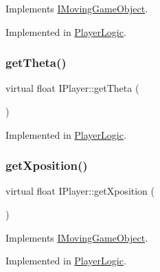 Implements \hyperlink{class_i_moving_game_object_ab2120f126d088beda46654aa3ccfd705}{I\+Moving\+Game\+Object}.



Implemented in \hyperlink{class_player_logic_a2ca2c54d1e07bfc40a08b5c55403af3a}{Player\+Logic}.

\mbox{\label{class_i_player_a05103e6bebfd4230bab62d112c7e4eec}} 
\subsubsection{\texorpdfstring{get\+Theta()}{getTheta()}}
{\footnotesize\ttfamily virtual float I\+Player\+::get\+Theta (\begin{DoxyParamCaption}{ }\end{DoxyParamCaption})\hspace{0.3cm}{\ttfamily [pure virtual]}}



Implemented in \hyperlink{class_player_logic_a7ea2f59ddde028b5451ddbe60453de1c}{Player\+Logic}.

\mbox{\label{class_i_player_a9df96a1fd43f35f2579e2ec4a167acfe}} 
\subsubsection{\texorpdfstring{get\+Xposition()}{getXposition()}}
{\footnotesize\ttfamily virtual float I\+Player\+::get\+Xposition (\begin{DoxyParamCaption}{ }\end{DoxyParamCaption})\hspace{0.3cm}{\ttfamily [pure virtual]}}



Implements \hyperlink{class_i_moving_game_object_acc7f0195491b1843558c8c558cbc7363}{I\+Moving\+Game\+Object}.



Implemented in \hyperlink{class_player_logic_a9f92defe2d43690329bd6e334fb61e01}{Player\+Logic}.

\mbox{\label{class_i_player_af72407abf2418dd9c1df50f29d51f0ef}} 
